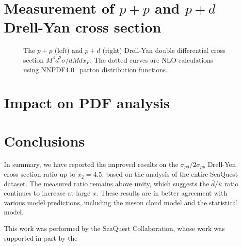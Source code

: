 \documentclass[reprint,aps,unsortedaddress,superscriptaddress,prc,floatfix,showpacs,linenumbers,final]{revtex4-2}
\begin{document}
\section{Measurement of \texorpdfstring{$p+p$}{p+p} and \texorpdfstring{$p+d$}{p+d} Drell-Yan cross section}
\label{sec:abs_cs}
\begin{figure}
	\caption{The $p+p$ (left) and $p+d$ (right) Drell-Yan double differential cross section $M^3d^2\sigma/dMdx_F$.
		The dotted curves are NLO calculations using NNPDF4.0~\cite{ball2022a} parton distribution functions.}
\end{figure}

\section{Impact on PDF analysis}

\section{Conclusions}
\label{sec:Conclusions}
In summary, we have reported the improved results on the $\sigma_{pd}/2\sigma_{pp}$ Drell-Yen cross section ratio up to $x_2=4.5$,
based on the analysis of the entire SeaQuest dataset.
The measured ratio remains above unity, which suggests the $\bar{d}/\bar{u}$ ratio continues to increase at large $x$.
These results are in better agreement with various model predictions, including the meson cloud model and the statistical model.

\begin{acknowledgments}
	This work was performed by the SeaQuest Collaboration, whose work was supported in part by the
\end{acknowledgments}

\end{document}

